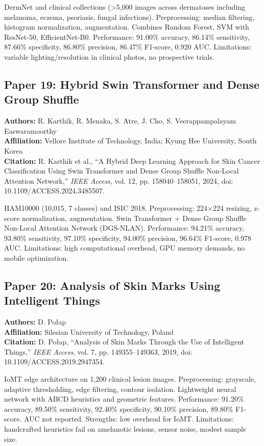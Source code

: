 \documentclass[conference]{IEEEtran}
\begin{document}
DermNet and clinical collections (>5,000 images across dermatoses including melanoma, eczema, psoriasis, fungal infections). Preprocessing: median filtering, histogram normalization, augmentation. Combines Random Forest, SVM with ResNet-50, EfficientNet-B0. Performance: 91.00\% accuracy, 86.14\% sensitivity, 87.66\% specificity, 86.80\% precision, 86.47\% F1-score, 0.920 AUC. Limitations: variable lighting/resolution in clinical photos, no prospective trials.

\subsection{Paper 19: Hybrid Swin Transformer and Dense Group Shuffle}

\noindent\textbf{Authors:} R. Karthik, R. Menaka, S. Atre, J. Cho, S. Veerappampalayam Easwaramoorthy\\
\textbf{Affiliation:} Vellore Institute of Technology, India; Kyung Hee University, South Korea\\
\textbf{Citation:} R. Karthik et al., ``A Hybrid Deep Learning Approach for Skin Cancer Classification Using Swin Transformer and Dense Group Shuffle Non-Local Attention Network,'' \textit{IEEE Access}, vol. 12, pp. 158040--158051, 2024, doi: 10.1109/ACCESS.2024.3485507.

HAM10000 (10,015, 7 classes) and ISIC 2018. Preprocessing: 224×224 resizing, z-score normalization, augmentation. Swin Transformer + Dense Group Shuffle Non-Local Attention Network (DGS-NLAN). Performance: 94.21\% accuracy, 93.80\% sensitivity, 97.10\% specificity, 94.00\% precision, 96.64\% F1-score, 0.978 AUC. Limitations: high computational overhead, GPU memory demands, no mobile optimization.

\subsection{Paper 20: Analysis of Skin Marks Using Intelligent Things}

\noindent\textbf{Authors:} D. Połap\\
\textbf{Affiliation:} Silesian University of Technology, Poland\\
\textbf{Citation:} D. Połap, ``Analysis of Skin Marks Through the Use of Intelligent Things,'' \textit{IEEE Access}, vol. 7, pp. 149355--149363, 2019, doi: 10.1109/ACCESS.2019.2947354.

IoMT edge architecture on 1,200 clinical lesion images. Preprocessing: grayscale, adaptive thresholding, edge filtering, contour isolation. Lightweight neural network with ABCD heuristics and geometric features. Performance: 91.20\% accuracy, 89.50\% sensitivity, 92.40\% specificity, 90.10\% precision, 89.80\% F1-score. AUC not reported. Strengths: low overhead for IoMT. Limitations: handcrafted heuristics fail on amelanotic lesions, sensor noise, modest sample size.
\end{document}
